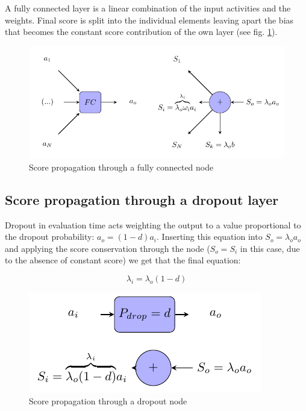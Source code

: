 \documentclass[review]{elsarticle}
\theoremstyle{definition} %
\theoremstyle{remark}
\begin{document}
A fully connected layer is a linear combination of the input activities and the weights. Final score is split into the individual elements leaving apart the bias that becomes the constant score contribution of the own layer (see fig. \ref{fig:score_fc}).

\begin{figure}[!ht]
	\centering
	\includegraphics{./figures/score_fc.pdf}
	\caption{Score propagation through a fully connected node}
	\label{fig:score_fc}
\end{figure}

\subsection{Score propagation through a dropout layer}

Dropout in evaluation time acts weighting the output to a value proportional to the dropout probability: $a_o = (1-d)a_i$. Inserting this equation into $S_o = \lambda_o a_o$ and applying the score conservation through the node ($S_o = S_i$ in this case, due to the absence of constant score) we get that the final equation:

\begin{equation}
 \lambda_i = \lambda_o (1-d)
\end{equation}

\begin{figure}[!ht]
	\centering
	\includegraphics{./figures/score_dropout.pdf}
	\caption{Score propagation through a dropout node}
	\label{fig:score_dropout}
\end{figure}
\end{document}
